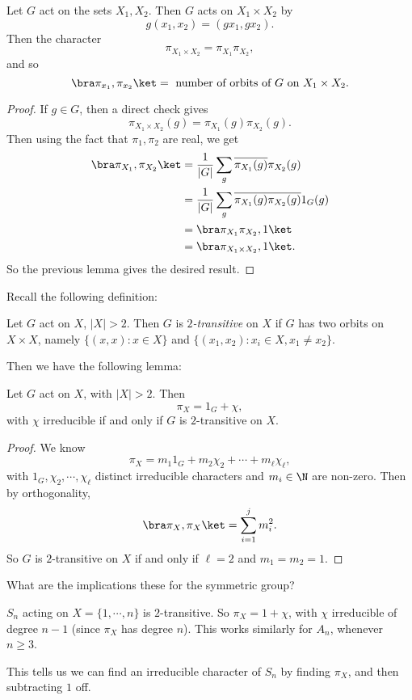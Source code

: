 \documentclass[a4paper]{article}
\begin{document}
\begin{lemma}
  Let $G$ act on the sets $X_1, X_2$. Then $G$ acts on $X_1 \times X_2$ by
  \[
    g(x_1, x_2) = (g x_1, g x_2).
  \]
  Then the character
  \[
    \pi_{X_1 \times X_2} = \pi_{X_1}\pi_{X_2},
  \]
  and so
  \[
    \bra \pi_{x_1}, \pi_{x_2}\ket = \text{ number of orbits of }G\text{ on }X_1 \times X_2.
  \]
\end{lemma}

\begin{proof}
  If $g \in G$, then a direct check gives
  \[
    \pi_{X_1 \times X_2}(g) = \pi_{X_1}(g) \pi_{X_2}(g). %
  \]
  Then using the fact that $\pi_1, \pi_2$ are real, we get
  \begin{align*}
    \bra \pi_{X_1}, \pi_{X_2}\ket &= \frac{1}{|G|} \sum_g \overline{\pi_{X_1}(g)}\pi_{X_2}(g)\\
    &= \frac{1}{|G|} \sum_g \overline{\pi_{X_1}(g) \pi_{X_2}(g)} 1_G(g)\\
    &= \bra \pi_{X_1}\pi_{X_2}, 1\ket \\
    &= \bra \pi_{X_1\times X_2}, 1\ket.
  \end{align*}
  So the previous lemma gives the desired result.
\end{proof}

Recall the following definition:
\begin{defi}[$2$-transitive]
  Let $G$ act on $X$, $|X| > 2$. Then $G$ is \emph{$2$-transitive} on $X$ if $G$ has two orbits on $X \times X$, namely $\{(x, x): x \in X\}$ and $\{(x_1, x_2): x_i \in X, x_1 \not= x_2\}$.
\end{defi}
Then we have the following lemma:

\begin{lemma}
  Let $G$ act on $X$, with $|X| > 2$. Then
  \[
    \pi_X = 1_G + \chi,
  \]
  with $\chi$ irreducible if and only if $G$ is $2$-transitive on $X$.
\end{lemma}

\begin{proof}
  We know
  \[
    \pi_X = m_1 1_G + m_2 \chi_2 + \cdots + m_\ell \chi_\ell,
  \]
  with $1_G, \chi_2, \cdots, \chi_\ell$ distinct irreducible characters and $m_i \in \N$ are non-zero. Then by orthogonality,
  \[
    \bra \pi_X, \pi_X\ket = \sum_{i = 1}^j m_i^2.
  \]
  So $G$ is $2$-transitive on $X$ if and only if $\ell = 2$ and $m_1 = m_2 = 1$.
\end{proof}
What are the implications these for the symmetric group?

\begin{eg}
  $S_n$ acting on $X = \{1, \cdots, n\}$ is $2$-transitive. So $\pi_X = 1 + \chi$, with $\chi$ irreducible of degree $n - 1$ (since $\pi_X$ has degree $n$). This works similarly for $A_n$, whenever $n \geq 3$.
\end{eg}
This tells us we can find an irreducible character of $S_n$ by finding $\pi_X$, and then subtracting $1$ off.
\end{document}
